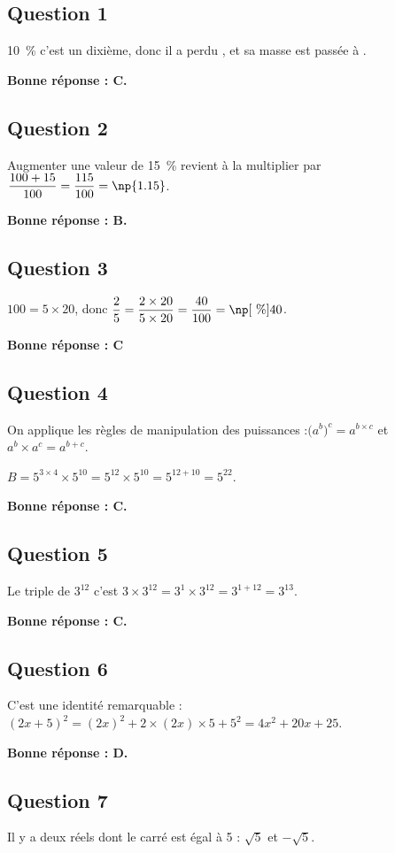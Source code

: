\subsection*{Question 1}
	10~\% c'est un dixième, donc il a perdu , et sa masse est passée à .

	\textbf{Bonne réponse : C.}

\subsection*{Question 2}
	Augmenter une valeur de 15~\% revient à la multiplier par \quad $\dfrac{100+15}{100} = \dfrac{115}{100} = \np{1.15}$.

	\textbf{Bonne réponse : B.}

\subsection*{Question 3}
	$100 = 5\times 20$, \quad donc \quad $\dfrac25 = \dfrac{2\times20}{5\times20} = \dfrac{40}{100} = \np[~\%]{40}$.

	\textbf{Bonne réponse : C}

\subsection*{Question 4}
	On applique les règles de manipulation des puissances  :\quad $\big(a^b\big)^c  =  a^{b \times c}$ \quad et  \quad $a^b \times a^c  =  a^{b + c}$.

	$B = 5^{3\times4}\times5^{10} = 5^{12}\times5^{10} = 5^{12+10} = 5^{22}$.

	\textbf{Bonne réponse : C.}

\subsection*{Question 5}
	Le triple de $3^{12}$ c'est \quad $3\times3^{12} = 3^1\times3^{12} = 3^{1+12} = 3^{13}$.

	\textbf{Bonne réponse : C.}

\subsection*{Question 6}
	C'est une identité remarquable :\quad $(2x+5)^2 = (2x)^2+2\times(2x)\times5+5^2 = 4x^2+20x+25$.

	\textbf{Bonne réponse : D.}

\subsection*{Question 7}
	Il y a deux réels dont le carré est égal à 5 : \quad $\sqrt{5}$ et $-\sqrt{5}$.

